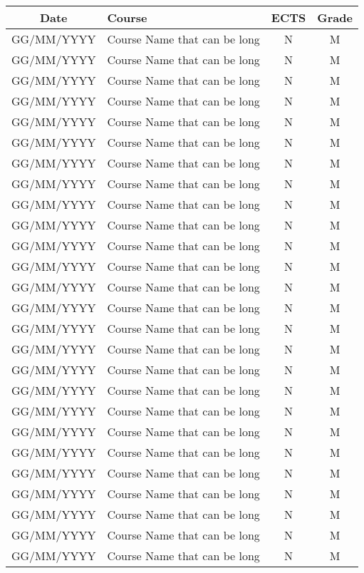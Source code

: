\documentclass[10pt,a4paper,ragged2e]{maltacv}
\begin{document}
\begin{center}
\begin{onehalfspace}
\begin{tabular}{ c m{9.5cm} c c }
  \textbf{Date} & \textbf{Course} & \textbf{ECTS} & \textbf{Grade}\\\hline
  GG/MM/YYYY & Course Name that can be long & N & M \\\hline
  GG/MM/YYYY & Course Name that can be long & N & M \\\hline
  GG/MM/YYYY & Course Name that can be long & N & M \\\hline
  GG/MM/YYYY & Course Name that can be long & N & M \\\hline
  GG/MM/YYYY & Course Name that can be long & N & M \\\hline
  GG/MM/YYYY & Course Name that can be long & N & M \\\hline
  GG/MM/YYYY & Course Name that can be long & N & M \\\hline
  GG/MM/YYYY & Course Name that can be long & N & M \\\hline
  GG/MM/YYYY & Course Name that can be long & N & M \\\hline
  GG/MM/YYYY & Course Name that can be long & N & M \\\hline
  GG/MM/YYYY & Course Name that can be long & N & M \\\hline
  GG/MM/YYYY & Course Name that can be long & N & M \\\hline
  GG/MM/YYYY & Course Name that can be long & N & M \\\hline
  GG/MM/YYYY & Course Name that can be long & N & M \\\hline
  GG/MM/YYYY & Course Name that can be long & N & M \\\hline
  GG/MM/YYYY & Course Name that can be long & N & M \\\hline
  GG/MM/YYYY & Course Name that can be long & N & M \\\hline
  GG/MM/YYYY & Course Name that can be long & N & M \\\hline
  GG/MM/YYYY & Course Name that can be long & N & M \\\hline
  GG/MM/YYYY & Course Name that can be long & N & M \\\hline
  GG/MM/YYYY & Course Name that can be long & N & M \\\hline
  GG/MM/YYYY & Course Name that can be long & N & M \\\hline
  GG/MM/YYYY & Course Name that can be long & N & M \\\hline
  GG/MM/YYYY & Course Name that can be long & N & M \\\hline
  GG/MM/YYYY & Course Name that can be long & N & M \\\hline
  GG/MM/YYYY & Course Name that can be long & N & M
\end{tabular}
\end{onehalfspace}
\end{center}
\end{document}
